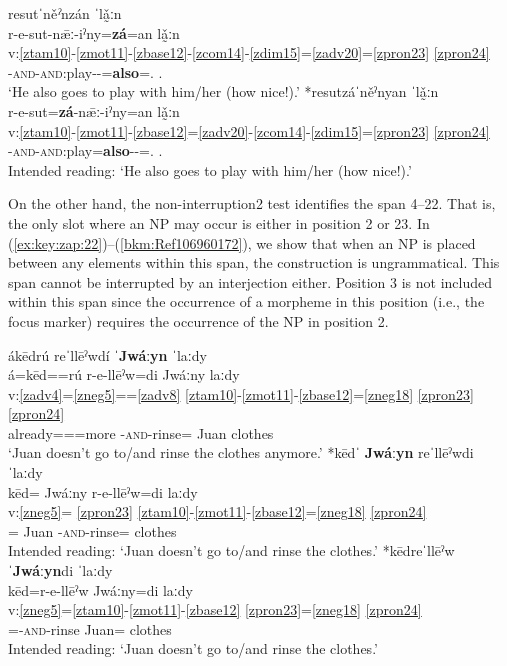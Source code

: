 \documentclass[output=paper]{langscibook}
\begin{document}
\ea\label{bkm:Ref82095670}
{resutˈně\textit{ˀ}nzán ˈlǎ̰ːn} \\
\glll r-e-sut-nǣː-iˀny=\textbf{zá}=an lǎ̰ːn\\
v:\ref{ztam10}-\ref{zmot11}-\ref{zbase12}-\ref{zcom14}-\ref{zdim15}=\ref{zadv20}=\ref{zpron23} \ref{zpron24} \\
\Hab{}-\textsc{and}-\textsc{and}:play-\Com{}-\Dim{}=\textbf{also}=\Third\Sg{}.\Inf{} \Third\Sg{}.\Inf{} \\
\glt `He also goes to play with him/her (how nice!).'
\ex\label{ex:key:zap:20}
{*resutzáˈněˀnyan   ˈlǎ̰ːn}\\
\glll r-e-sut=\textbf{zá}-nǣː-iˀny=an lǎ̰ːn\\
v:\ref{ztam10}-\ref{zmot11}-\ref{zbase12}=\ref{zadv20}-\ref{zcom14}-\ref{zdim15}=\ref{zpron23} \ref{zpron24} \\
\Hab{}-\textsc{and}-\textsc{and}:play=\textbf{also}-\Com{}-\Dim{}=\Third\Sg{}.\Inf{} \Third\Sg{}.\Inf{} \\
\glt Intended reading: `He also goes to play with him/her (how nice!).'
\z

On the other hand, the non-interruption2 test identifies the span 4–22. That is, the only slot where an NP may occur is either in position 2 or 23. In (\ref{ex:key:zap:22})–(\ref{bkm:Ref106960172}), we show that when an NP is placed between any elements within this span, the construction is ungrammatical. This span cannot be interrupted by an interjection either. Position 3 is not included within this span since the occurrence of a morpheme in this position (i.e., the focus marker) requires the occurrence of the NP in position 2.

\ea\label{bkm:Ref82095835}
{ákēdrú reˈllēˀwdí ˈ\textbf{Jwá}ː\textbf{yn} ˈlaːdy} \\
\glll á=kēd==rú r-e-llēˀw=di Jwáːny laːdy \\
v:\ref{zadv4}=\ref{zneg5}==\ref{zadv8} \ref{ztam10}-\ref{zmot11}-\ref{zbase12}=\ref{zneg18} \ref{zpron23} \ref{zpron24} \\
already=\Neg{}==more \Hab{}-\textsc{and}-rinse=\Neg{} Juan clothes \\
\glt `Juan doesn't go to/and rinse the clothes anymore.'
\ex\label{ex:key:zap:22}
{*kēdˈ \textbf{Jwá}ː\textbf{yn} reˈllēˀwdi ˈlaːdy}\\
\glll kēd= Jwáːny r-e-llēˀw=di laːdy\\
v:\ref{zneg5}= \ref{zpron23} \ref{ztam10}-\ref{zmot11}-\ref{zbase12}=\ref{zneg18} \ref{zpron24} \\
\Neg{}= Juan \Hab{}-\textsc{and}-rinse=\Neg{} clothes\\
\glt Intended reading: `Juan doesn't go to/and rinse the clothes.'
\ex\label{bkm:Ref106960172}
{*kēdreˈllēˀw ˈ\textbf{Jwá}ː\textbf{yn}di ˈlaːdy}\\
\glll kēd=r-e-llēˀw Jwáːny=di laːdy\\
v:\ref{zneg5}=\ref{ztam10}-\ref{zmot11}-\ref{zbase12} \ref{zpron23}=\ref{zneg18} \ref{zpron24} \\
\Neg{}=\Hab{}-\textsc{and}-rinse Juan=\Neg{} clothes\\
\glt Intended reading: `Juan doesn't go to/and rinse the clothes.'
\z
\end{document}
